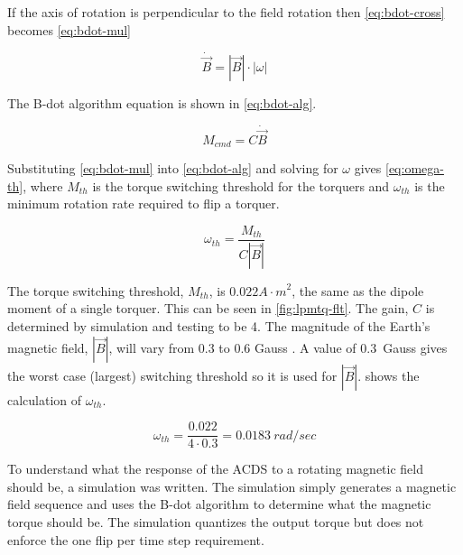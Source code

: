 If the axis of rotation is perpendicular to the field rotation then \cref{eq:bdot-cross} becomes \cref{eq:bdot-mul}

\begin{equation}
    \dot{\vec{B}} = \left| \vec{B} \right| \cdot \left| \omega \right|
    \label{eq:bdot-mul}
\end{equation}

The B-dot algorithm equation is shown in \cref{eq:bdot-alg}.

\begin{equation}
    M_{cmd} = C \dot{\vec{B}} 
    \label{eq:bdot-alg}
\end{equation}

Substituting \cref{eq:bdot-mul} into \cref{eq:bdot-alg} and solving for $\omega$ gives \cref{eq:omega-th}, where $M_{th}$ is the torque switching threshold for the torquers and $\omega_{th}$ is the minimum rotation rate required to flip a torquer.

\begin{equation}
    \omega _ {th} = \frac{M _ {th}}{C \left| \vec{B} \right|}
    \label{eq:omega-th}
\end{equation}

The torque switching threshold, $M_{th}$, is $0.022 \unit{A \cdot m} ^2$, the same as the dipole moment of a single torquer. This can be seen in \cref{fig:lpmtq-flt}. The gain, $C$ is determined by simulation and testing to be 4. The magnitude of the Earth's magnetic field, ${\left| \vec{B} \right|}$, will vary from 0.3 to 0.6 Gauss \cite[pp.~114]{Wertz}. A value of 0.3~Gauss gives the worst case (largest) switching threshold so it is used for ${\left| \vec{B} \right|}$.  shows the calculation of $\omega_{th}$.

\begin{equation}
    \omega _ {th} =  \frac{0.022}{4 \cdot 0.3} = 0.0183 ~ \unit{rad / sec}
    \label{eq:omega-th-calc}
\end{equation}

To understand what the response of the \ac{ACDS} to a rotating magnetic field should be, a simulation was written. The simulation simply generates a magnetic field sequence and uses the B-dot algorithm to determine what the magnetic torque should be. The simulation quantizes the output torque but does not enforce the one flip per time step requirement.


